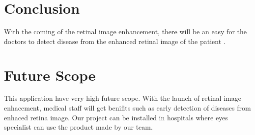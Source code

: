 \section{Conclusion}
With the coming of the retinal image enhancement, there will be an easy for the doctors to detect disease from the enhanced retinal image of the patient . 

\section{Future Scope}
This application have very high future scope. With the launch of retinal image enhacement, medical staff will get benifits such as early detection of diseases from enhaced retina image. Our project can be installed in hospitals where eyes specialist can use the product made by our team.	   